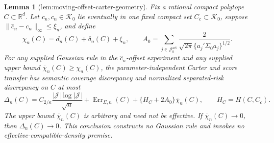 \documentclass{article}
\newtheorem{lemma}{Lemma}
\begin{document}
\begin{lemma}[lem:moving-offset-carter-geometry]\label{lem:moving-offset-carter-geometry}
Fix a rational compact polytope \(C\subset\mathbb R^d\).  Let \(c_n,\widehat c_n\in\mathcal K_0\) lie eventually in one fixed compact set \(C_c\subset\mathcal K_0\), suppose \(\|\widehat c_n-c_n\|_\infty\le\xi_n\), and define
\[
\chi_n(C)=d_n(C)+\delta_n(C)+\xi_n,
\qquad
A_0=\sum_{j\in\mathcal J_0^{\mathrm{act}}}
\frac{2}{\sqrt{2\pi}\{a_j'\Sigma_0a_j\}^{1/2}}.
\]
For any supplied Gaussian rule in the \(\widehat c_n\)-offset experiment and any supplied upper bound \(\overline\chi_n(C)\ge\chi_n(C)\), the parameter-independent Carter and score transfer has semantic coverage discrepancy and normalized separated-risk discrepancy on \(C\) at most
\[
\Delta_n(C)=C_{2/\kappa}\frac{|\mathcal J|\log|\mathcal J|}{\sqrt n}
+\operatorname{Err}_{\Sigma,n}(C)
+\{H_C+2A_0\}\overline\chi_n(C),
\qquad H_C=H(C,C_c).
\]
The upper bound \(\overline\chi_n(C)\) is arbitrary and need not be effective.  If \(\overline\chi_n(C)\to0\), then \(\Delta_n(C)\to0\).  This conclusion constructs no Gaussian rule and invokes no effective-compatible-density premise.
\end{lemma}
\end{document}
